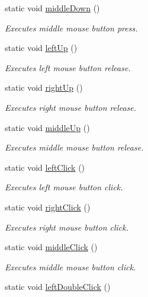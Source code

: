 \begin{DoxyCompactItemize}
static void \hyperlink{class_lua_api_engine_abea870a5edb171b0bc2345dd1e1e7b95}{middle\-Down} ()
\begin{DoxyCompactList}\small\item\em Executes middle mouse button press. \end{DoxyCompactList}\item 
static void \hyperlink{class_lua_api_engine_a926f72169c400bb32186737f03208e1c}{left\-Up} ()
\begin{DoxyCompactList}\small\item\em Executes left mouse button release. \end{DoxyCompactList}\item 
static void \hyperlink{class_lua_api_engine_ae8b09733792cc95ca22654be8074bfbf}{right\-Up} ()
\begin{DoxyCompactList}\small\item\em Executes right mouse button release. \end{DoxyCompactList}\item 
static void \hyperlink{class_lua_api_engine_a2cd4a53a99e262aa9d5e83a2b34b6538}{middle\-Up} ()
\begin{DoxyCompactList}\small\item\em Executes middle mouse button release. \end{DoxyCompactList}\item 
static void \hyperlink{class_lua_api_engine_ae857b39d951f50a206989c3422cb5494}{left\-Click} ()
\begin{DoxyCompactList}\small\item\em Executes left mouse button click. \end{DoxyCompactList}\item 
static void \hyperlink{class_lua_api_engine_a7b3664b6f2593d3bd817edeee61a18e6}{right\-Click} ()
\begin{DoxyCompactList}\small\item\em Executes right mouse button click. \end{DoxyCompactList}\item 
static void \hyperlink{class_lua_api_engine_a633c229323434db2d1af7f66c1517a34}{middle\-Click} ()
\begin{DoxyCompactList}\small\item\em Executes middle mouse button click. \end{DoxyCompactList}\item 
static void \hyperlink{class_lua_api_engine_a2004f3ce56fc785e0276491642e39e7a}{left\-Double\-Click} ()

\end{DoxyCompactItemize}
